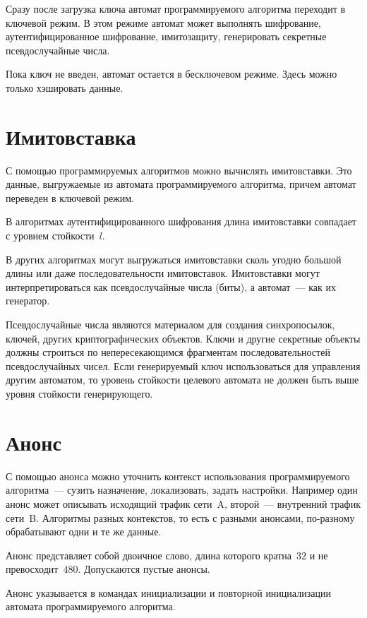 Сразу после загрузка ключа автомат программируемого алгоритма переходит в ключевой 
режим. В этом режиме автомат может выполнять шифрование, аутентифицированное 
шифрование, имитозащиту, генерировать секретные псевдослучайные числа.

Пока ключ не введен, автомат остается в бесключевом режиме. Здесь можно только 
хэшировать данные. 

\section{Имитовставка}\label{COMMON.MAC}

С помощью программируемых алгоритмов можно вычислять имитовставки.
Это данные, выгружаемые из автомата программируемого алгоритма,
причем автомат переведен в ключевой режим.

В алгоритмах аутентифицированного шифрования длина имитовставки 
совпадает с уровнем стойкости~$l$. 

В других алгоритмах могут выгружаться имитовставки сколь угодно большой длины
или даже последовательности имитовставок. Имитовставки могут интерпретироваться 
как псевдослучайные числа (биты), а автомат~--- как их генератор.

Псевдослучайные числа являются материалом для создания синхропосылок,
ключей, других криптографических объектов. 
%
Ключи и другие секретные объекты должны строиться по непересекающимся 
фрагментам последовательностей псевдослучайных чисел.
%
Если генерируемый ключ использоваться для управления другим автоматом, то
уровень стойкости целевого автомата не должен быть выше уровня стойкости
генерирующего.

\section{Анонс}\label{COMMON.Anounce}

С помощью анонса можно уточнить контекст использования программируемого 
алгоритма~--- сузить назначение, локализовать, задать настройки.
%
Например один анонс может описывать исходящий трафик сети~A, 
второй~--- внутренний трафик сети~B.
%
Алгоритмы разных контекстов, то есть с разными анонсами, 
по-разному обрабатывают одни и те же данные. 

Анонс представляет собой двоичное слово, длина которого кратна~$32$ и не 
превосходит~$480$. Допускаются пустые анонсы.

Анонс указывается в командах инициализации и повторной инициализации
автомата программируемого алгоритма. 

